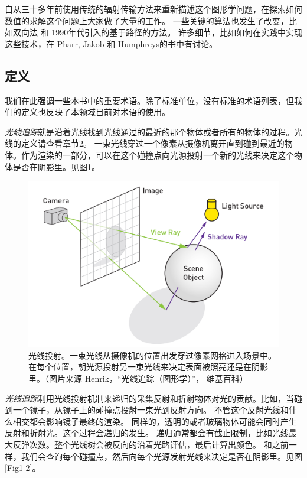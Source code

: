 \documentclass[12pt]{article}
\begin{document}
 自从三十多年前使用传统的辐射传输方法来重新描述这个图形学问题，在探索如何数值的求解这个问题上大家做了大量的工作。
 一些关键的算法也发生了改变，比如双向法\cite{LW1993BPT,10.1007/978-3-642-87825-1_11} 和 1990年代引入的基于路径的方法\cite{Veach:1997:MLT:258734.258775}。
许多细节，比如如何在实践中实现这些技术，在 Pharr, Jakob 和 Humphreys的书\cite{pharr2016physically}中有讨论。


\subsection{定义}
我们在此强调一些本书中的重要术语。除了标准单位，没有标准的术语列表，但我们的定义也反映了本领域目前对术语的使用。
 
\textit{光线追踪}就是沿着光线找到光线通过的最近的那个物体或者所有的物体的过程。光线的定义请查看章节2。
一束光线穿过一个像素从摄像机离开直到碰到最近的物体。作为渲染的一部分，可以在这个碰撞点向光源投射一个新的光线来决定这个物体是否在阴影里。见图\ref{Fig1-1}。
 
\begin{figure}
	\centering
	\includegraphics[width=12.0cm]{Fig1-1.png}
	\caption{光线投射。一束光线从摄像机的位置出发穿过像素网格进入场景中。在每个位置，朝光源投射另一束光线来决定表面被照亮还是在阴影里。（图片来源 Henrik，“光线追踪（图形学）”， 维基百科）}
	\label{Fig1-1}
\end{figure}

\textit{光线追踪}利用光线投射机制来递归的采集反射和折射物体对光的贡献。比如，当碰到一个镜子，从镜子上的碰撞点投射一束光到反射方向。
不管这个反射光线和什么相交都会影响镜子最终的渲染。
同样的，透明的或者玻璃物体可能会同时产生反射和折射光。这个过程会递归的发生。
递归通常都会有截止限制，比如光线最大反弹次数。整个光线树会被反向的沿着光路评估，最后计算出颜色。
和之前一样，我们会查询每个碰撞点，然后向每个光源发射光线来决定是否在阴影里。见图\ref{Fig1-2}。
\end{document}
